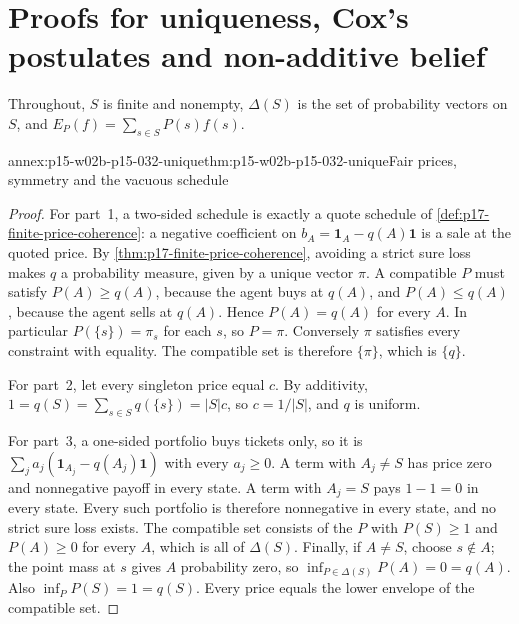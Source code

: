 \section{Proofs for uniqueness, Cox's postulates and non-additive belief}
\label{sec:annex-p15-w02b-p15-032}

Throughout, \(S\) is finite and nonempty, \(\Delta(S)\) is the set of
probability vectors on \(S\), and \(E_P(f)=\sum_{s\in S}P(s)f(s)\).

\begin{annexitem}{annex:p15-w02b-p15-032-unique}{thm:p15-w02b-p15-032-unique}{Fair prices, symmetry and the vacuous schedule}
\begin{proof}
For part~1, a two-sided schedule is exactly a quote schedule of
\cref{def:p17-finite-price-coherence}: a negative coefficient on
\(b_A=\mathbf 1_A-q(A)\mathbf 1\) is a sale at the quoted price. By
\cref{thm:p17-finite-price-coherence}, avoiding a strict sure loss makes
\(q\) a probability measure, given by a unique vector \(\pi\). A compatible
\(P\) must satisfy \(P(A)\geq q(A)\), because the agent buys at \(q(A)\),
and \(P(A)\leq q(A)\), because the agent sells at \(q(A)\). Hence
\(P(A)=q(A)\) for every \(A\). In particular \(P(\{s\})=\pi_s\) for each
\(s\), so \(P=\pi\). Conversely \(\pi\) satisfies every constraint with
equality. The compatible set is therefore \(\{\pi\}\), which is \(\{q\}\).

For part~2, let every singleton price equal \(c\). By additivity,
\(1=q(S)=\sum_{s\in S}q(\{s\})=|S|c\), so \(c=1/|S|\), and \(q\) is uniform.

For part~3, a one-sided portfolio buys tickets only, so it is
\(\sum_ja_j(\mathbf 1_{A_j}-q(A_j)\mathbf 1)\) with every \(a_j\geq0\).
A term with \(A_j\neq S\) has price zero and nonnegative payoff in every
state. A term with \(A_j=S\) pays \(1-1=0\) in every state. Every such
portfolio is therefore nonnegative in every state, and no strict sure loss
exists. The compatible set consists of the \(P\) with \(P(S)\geq1\) and
\(P(A)\geq0\) for every \(A\), which is all of \(\Delta(S)\). Finally, if
\(A\neq S\), choose \(s\notin A\); the point mass at \(s\) gives \(A\)
probability zero, so \(\inf_{P\in\Delta(S)}P(A)=0=q(A)\). Also
\(\inf_PP(S)=1=q(S)\). Every price equals the lower envelope of the
compatible set.
\end{proof}\end{annexitem}

